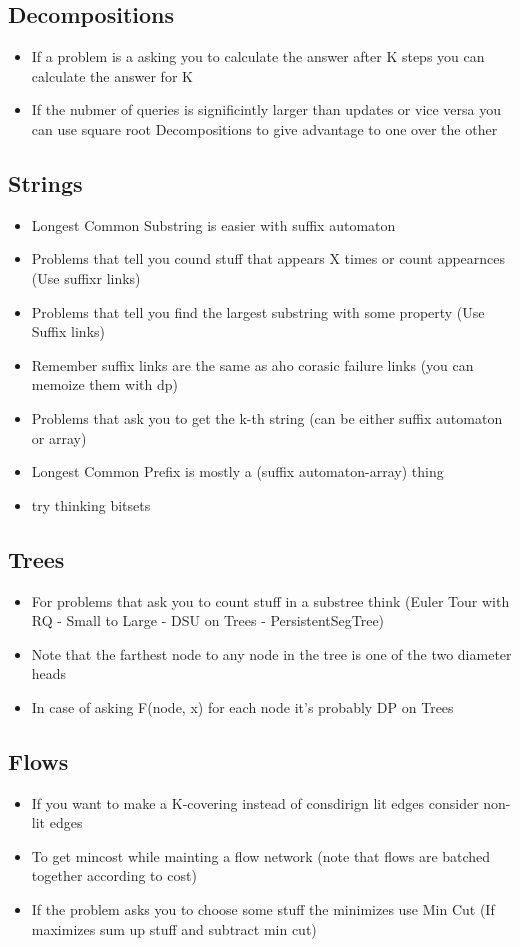 \subsection{Decompositions}
\begin{itemize}
\item If a problem is a asking you to calculate the answer after K steps you can calculate the answer for K%
\item If the nubmer of queries is significintly larger than updates or vice versa you can use square root Decompositions to give advantage to one over the other
\end{itemize}
\hrulefill
\subsection{Strings}
\begin{itemize}
\item Longest Common Substring is easier with suffix automaton 
\item Problems that tell you cound stuff that appears X times or count appearnces (Use suffixr links)
\item Problems that tell you find the largest substring with some property (Use Suffix links)
\item Remember suffix links are the same as aho corasic failure links (you can memoize them with dp)
\item Problems that ask you to get the k-th string (can be either suffix automaton or array)
\item Longest Common Prefix is mostly a (suffix automaton-array) thing
\item try thinking bitsets
\end{itemize}
\hrulefill 
\subsection{Trees}
\begin{itemize}
\item For problems that ask you to count stuff in a substree think (Euler Tour with RQ - Small to Large - DSU on Trees - PersistentSegTree)
\item Note that the farthest node to any node in the tree is one of the two diameter heads
\item In case of asking F(node, x) for each node it's probably DP on Trees
\end{itemize}
\hrulefill 
\subsection{Flows}
\begin{itemize}
\item If you want to make a K-covering instead of consdirign lit edges consider non-lit edges
\item To get mincost while mainting a flow network (note that flows are batched together according to cost)
\item If the problem asks you to choose some stuff the minimizes use Min Cut (If maximizes sum up stuff and subtract min cut)
\end{itemize}
\hrulefill 
